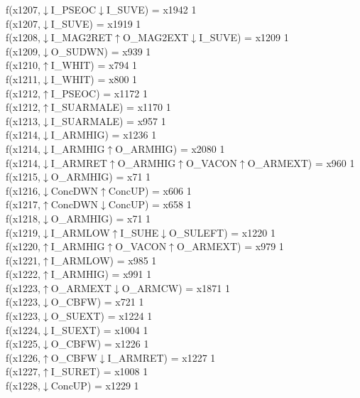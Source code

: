 f(x1207,$\downarrow$I\_PSEOC$\downarrow$I\_SUVE) = x1942 {1} \\
f(x1207,$\downarrow$I\_SUVE) = x1919 {1} \\
f(x1208,$\downarrow$I\_MAG2RET$\uparrow$O\_MAG2EXT$\downarrow$I\_SUVE) = x1209 {1} \\
f(x1209,$\downarrow$O\_SUDWN) = x939 {1} \\
f(x1210,$\uparrow$I\_WHIT) = x794 {1} \\
f(x1211,$\downarrow$I\_WHIT) = x800 {1} \\
f(x1212,$\uparrow$I\_PSEOC) = x1172 {1} \\
f(x1212,$\uparrow$I\_SUARMALE) = x1170 {1} \\
f(x1213,$\downarrow$I\_SUARMALE) = x957 {1} \\
f(x1214,$\downarrow$I\_ARMHIG) = x1236 {1} \\
f(x1214,$\downarrow$I\_ARMHIG$\uparrow$O\_ARMHIG) = x2080 {1} \\
f(x1214,$\downarrow$I\_ARMRET$\uparrow$O\_ARMHIG$\uparrow$O\_VACON$\uparrow$O\_ARMEXT) = x960 {1} \\
f(x1215,$\downarrow$O\_ARMHIG) = x71 {1} \\
f(x1216,$\downarrow$ConcDWN$\uparrow$ConcUP) = x606 {1} \\
f(x1217,$\uparrow$ConcDWN$\downarrow$ConcUP) = x658 {1} \\
f(x1218,$\downarrow$O\_ARMHIG) = x71 {1} \\
f(x1219,$\downarrow$I\_ARMLOW$\uparrow$I\_SUHE$\downarrow$O\_SULEFT) = x1220 {1} \\
f(x1220,$\uparrow$I\_ARMHIG$\uparrow$O\_VACON$\uparrow$O\_ARMEXT) = x979 {1} \\
f(x1221,$\uparrow$I\_ARMLOW) = x985 {1} \\
f(x1222,$\uparrow$I\_ARMHIG) = x991 {1} \\
f(x1223,$\uparrow$O\_ARMEXT$\downarrow$O\_ARMCW) = x1871 {1} \\
f(x1223,$\downarrow$O\_CBFW) = x721 {1} \\
f(x1223,$\downarrow$O\_SUEXT) = x1224 {1} \\
f(x1224,$\downarrow$I\_SUEXT) = x1004 {1} \\
f(x1225,$\downarrow$O\_CBFW) = x1226 {1} \\
f(x1226,$\uparrow$O\_CBFW$\downarrow$I\_ARMRET) = x1227 {1} \\
f(x1227,$\uparrow$I\_SURET) = x1008 {1} \\
f(x1228,$\downarrow$ConcUP) = x1229 {1} \\
